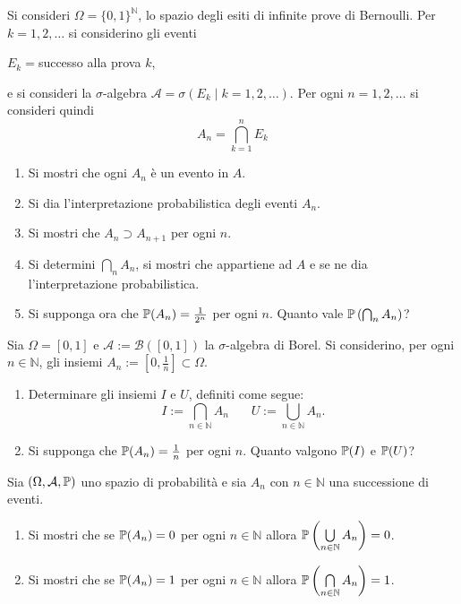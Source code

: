 Si consideri $\Omega =\{0,1\}^{\mathbb{N}}$, lo spazio degli esiti di infinite prove di Bernoulli. Per $k=1,2,\dotsc $ si considerino gli eventi
\begin{center}
$E_{k} =$successo alla prova $k$,
\end{center}
e si consideri la $\sigma $-algebra $\mathcal{A} =\sigma ( E_{k} \mid k=1,2,\dotsc )$. Per ogni $n=1,2,\dotsc $ si consideri quindi
\begin{equation*}
A_{n} =\bigcap _{k=1}^{n} E_{k}
\end{equation*}
\begin{enumerate}
\item Si mostri che ogni $A_{n}$ è un evento in $A$.
\item Si dia l'interpretazione probabilistica degli eventi $A_{n}$.
\item Si mostri che $A_{n} \supset A_{n+1}$ per ogni $n$.
\item Si determini $\bigcap _{n} A_{n}$, si mostri che appartiene ad $A$ e se ne dia l'interpretazione probabilistica.
\item Si supponga ora che $\P( A_{n}) =\frac{1}{2^{n}}$ per ogni $n$. Quanto vale $\P\left(\bigcap\nolimits _{n} A_{n}\right)$?
\end{enumerate}
\Esercizio{}

Sia $\Omega =[ 0,1]$ e $\mathcal{A} :=\mathcal{B}([ 0,1])$ la $\sigma $-algebra di Borel. Si considerino, per ogni $n\in \mathbb{N}$, gli insiemi $A_{n} :=\left[ 0,\frac{1}{n}\right] \subset \Omega $.
\begin{enumerate}
\item Determinare gli insiemi $I$ e $U$, definiti come segue:\begin{equation*}
I:=\bigcap _{n\in \mathbb{N}} A_{n} \ \ \ \ \ \ \ \ U:=\bigcup _{n\in \mathbb{N}} A_{n} .
\end{equation*}
\item Si supponga che $\P( A_{n}) =\frac{1}{n}$ per ogni $n$. Quanto valgono $\P( I)$ e $\P( U)$?
\end{enumerate}
\Esercizio{$\star$}

Sia $( \Omega ,\mathcal{A} ,\P)$ uno spazio di probabilità e sia $A_{n}$ con $n\in \mathbb{N}$ una successione di eventi.
\begin{enumerate}
\item Si mostri che se $\P( A_{n}) =0$ per ogni $n\in \mathbb{N}$ allora $\P\left(\bigcup\limits _{n\in \mathbb{N}} A_{n}\right) =0$.
\item Si mostri che se $\P( A_{n}) =1$ per ogni $n\in \mathbb{N}$ allora $\P\left(\bigcap\limits _{n\in \mathbb{N}} A_{n}\right) =1$.
\end{enumerate}
\Esercizio{$\star$}

